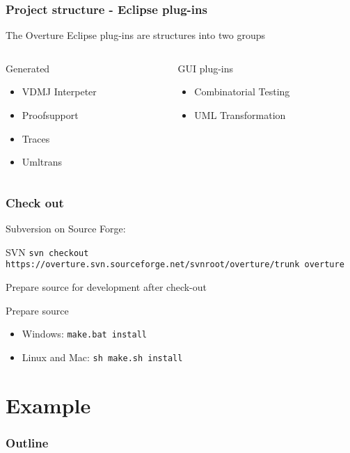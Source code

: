 \frame
{
  \frametitle{Project structure - Eclipse plug-ins}

The Overture Eclipse plug-ins are structures into two groups

\begin{columns}
\begin{column}{5cm}
	\begin{block}{Generated}
	\begin{itemize}
		\item VDMJ Interpeter
		\item Proofsupport
		\item Traces
		\item Umltrans
		
	 \end{itemize}
	\end{block}
\end{column}
\begin{column}{5cm}
	\pause
	\begin{block}{GUI plug-ins}
	\begin{itemize}
		\item Combinatorial Testing
		\item UML Transformation
	\end{itemize}
	\end{block}
\end{column}
\end{columns}

}


\frame
{
  \frametitle{Check out}

Subversion on Source Forge:
\begin{block}{SVN}
\small \texttt{svn checkout https://overture.svn.sourceforge.net/svnroot/overture/trunk overture}
\end{block}

Prepare source for development after check-out
\begin{block}{Prepare source}
\begin{itemize}
	\item Windows: \small \texttt{make.bat install}
	\item Linux and Mac: \small \texttt{sh make.sh install}
\end{itemize}
\end{block}

}

\section{Example}
%
%
\begin{frame}
  \frametitle{Outline}
  \tableofcontents[current]
\end{frame}


